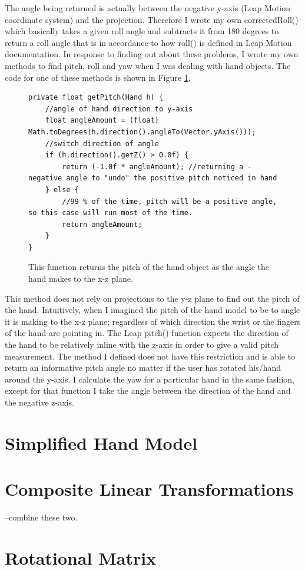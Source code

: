 The angle being returned is actually between the negative y-axis (Leap Motion coordinate system) and the projection. Therefore I wrote my own correctedRoll() which basically takes a given roll angle and subtracts it from 180 degrees to return a roll angle that is in accordance to how roll() is defined in Leap Motion documentation. In response to finding out about these problems, I wrote my own methods to find pitch, roll and yaw when I was dealing with hand objects. The code for one of these methods is shown in Figure \ref{fig:pitchCode}.
\begin{figure}[H]
\centering
\begin{lstlisting}
private float getPitch(Hand h) {
	//angle of hand direction to y-axis
	float angleAmount = (float) Math.toDegrees(h.direction().angleTo(Vector.yAxis()));
	//switch direction of angle
	if (h.direction().getZ() > 0.0f) {
		return (-1.0f * angleAmount); //returning a -negative angle to "undo" the positive pitch noticed in hand
	} else {
		//99 % of the time, pitch will be a positive angle, so this case will run most of the time.
		return angleAmount;
	}
}
\end{lstlisting}
\caption[getPitch() Function]{This function returns the pitch of the hand object as the angle the hand makes to the x-z plane.}
\label{fig:pitchCode}
\end{figure}
This method does not rely on projections to the y-z plane to find out the pitch of the hand. Intuitively, when I imagined the pitch of the hand model to be to angle it is making to the x-z plane; regardless of which direction the wrist or the fingers of the hand are pointing in. The Leap pitch() function expects the direction of the hand to be relatively inline with the z-axis in order to give a valid pitch measurement. The method I defined does not have this restriction and is able to return an informative pitch angle no matter if the user has rotated his/hand around the y-axis. I calculate the yaw for a particular hand in the same fashion, except for that function I take the angle between the direction of the hand and the negative z-axis. 


\section{Simplified Hand Model}
	
	
\section{Composite Linear Transformations}
--combine these two. 
\section{Rotational Matrix}





